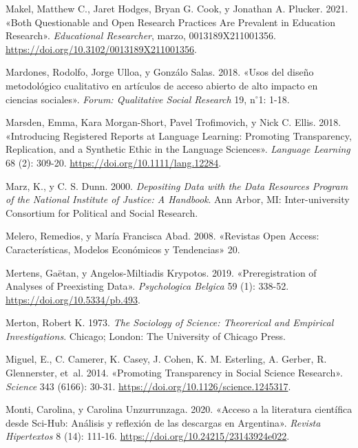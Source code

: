 \documentclass[
  spanish,
  a4paper,
  oneside]{scrbook}
\newlength{\cslhangindent}
\newenvironment{CSLReferences}[2] %
 {\begin{list}{}{%
  \setlength{\itemindent}{0pt}
  \setlength{\leftmargin}{0pt}
  \setlength{\parsep}{0pt}
  \ifodd #1
   \setlength{\leftmargin}{\cslhangindent}
   \setlength{\itemindent}{-1\cslhangindent}
  \fi
  \setlength{\itemsep}{#2\baselineskip}}}
 {\end{list}}
\begin{document}
\begin{CSLReferences}{1}{0}
Makel, Matthew C., Jaret Hodges, Bryan G. Cook, y Jonathan A. Plucker.
2021. {«Both {Questionable} and {Open Research Practices Are Prevalent}
in {Education Research}»}. \emph{Educational Researcher}, marzo,
0013189X211001356. \url{https://doi.org/10.3102/0013189X211001356}.

Mardones, Rodolfo, Jorge Ulloa, y Gonzálo Salas. 2018. {«{Usos del
dise{ñ}o metodol{ó}gico cualitativo en art{í}culos de acceso abierto de
alto impacto en ciencias sociales}»}. \emph{Forum: Qualitative Social
Research} 19, n{\(^\circ\)}1: 1-18.

Marsden, Emma, Kara Morgan-Short, Pavel Trofimovich, y Nick C. Ellis.
2018. {«Introducing {Registered Reports} at {Language Learning}:
{Promoting Transparency}, {Replication}, and a {Synthetic Ethic} in the
{Language Sciences}»}. \emph{Language Learning} 68 (2): 309-20.
\url{https://doi.org/10.1111/lang.12284}.

Marz, K., y C. S. Dunn. 2000. \emph{Depositing Data with the {Data
Resources Program} of the {National Institute} of {Justice}: {A}
Handbook}. Ann Arbor, MI: {Inter-university Consortium for Political and
Social Research}.

Melero, Remedios, y María Francisca Abad. 2008. {«Revistas {Open
Access}: Caracter{í}sticas, Modelos Econ{ó}micos y Tendencias»} 20.

Mertens, Gaëtan, y Angelos-Miltiadis Krypotos. 2019. {«Preregistration
of {Analyses} of {Preexisting Data}»}. \emph{Psychologica Belgica} 59
(1): 338-52. \url{https://doi.org/10.5334/pb.493}.

Merton, Robert K. 1973. \emph{The {Sociology} of {Science}:
{Theorerical} and {Empirical Investigations}}. Chicago; London: The
University of Chicago Press.

Miguel, E., C. Camerer, K. Casey, J. Cohen, K. M. Esterling, A. Gerber,
R. Glennerster, et~al. 2014. {«Promoting {Transparency} in {Social
Science Research}»}. \emph{Science} 343 (6166): 30-31.
\url{https://doi.org/10.1126/science.1245317}.

Monti, Carolina, y Carolina Unzurrunzaga. 2020. {«{Acceso a la
literatura cient{í}fica desde Sci-Hub: An{á}lisis y reflexi{ó}n de las
descargas en Argentina}»}. \emph{Revista Hipertextos} 8 (14): 111-16.
\url{https://doi.org/10.24215/23143924e022}.


\end{CSLReferences}
\end{document}
